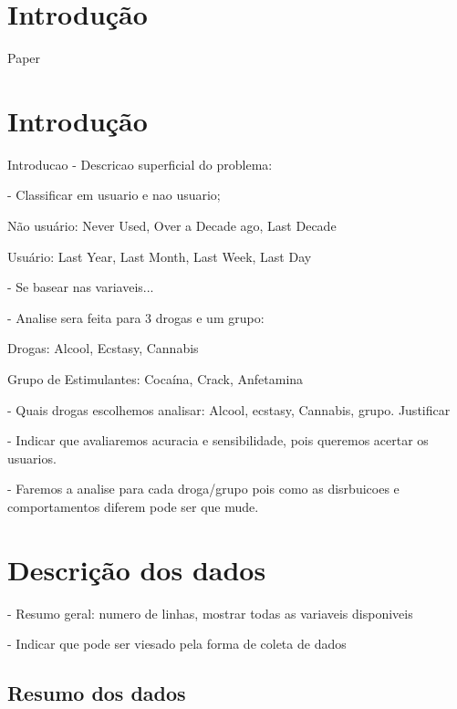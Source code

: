 \documentclass[
	article,			%
	11pt,				%
	oneside,			%
	a4paper,			%
	english,			%
	brazil,				%
	sumario=tradicional
	]{abntex2}
\begin{document}
\textual
\section*{Introdução}


Paper \cite{fehrman2015}

\section{Introdução}

Introducao - Descricao superficial do problema:

- Classificar em usuario e nao usuario;

Não usuário: Never Used, Over a Decade ago, Last Decade

Usuário: Last Year, Last Month, Last Week, Last Day

- Se basear nas variaveis...

- Analise sera feita para 3 drogas e um grupo:

Drogas: Alcool, Ecstasy, Cannabis

Grupo de Estimulantes: Cocaína, Crack, Anfetamina

- Quais drogas escolhemos analisar: Alcool, ecstasy, Cannabis, grupo. Justificar

- Indicar que avaliaremos acuracia e sensibilidade, pois queremos acertar os usuarios.

- Faremos a analise para cada droga/grupo pois como as disrbuicoes e comportamentos diferem pode ser que mude.

\section{Descrição dos dados}

- Resumo geral: numero de linhas, mostrar todas as variaveis disponiveis

- Indicar que pode ser viesado pela forma de coleta de dados

\subsection{Resumo dos dados}
\end{document}
